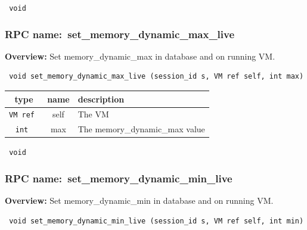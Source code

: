 \vspace{0.3cm}

{\tt 
void
}



\vspace{0.3cm}
\vspace{0.3cm}
\vspace{0.3cm}
\subsubsection{RPC name:~set\_memory\_dynamic\_max\_live}

{\bf Overview:} 
Set memory\_dynamic\_max in database and on running VM.

\begin{verbatim} void set_memory_dynamic_max_live (session_id s, VM ref self, int max)\end{verbatim}



 
\vspace{0.3cm}
\begin{tabular}{|c|c|p{7cm}|}
 \hline
{\bf type} & {\bf name} & {\bf description} \\ \hline
{\tt VM ref } & self & The VM \\ \hline 

{\tt int } & max & The memory\_dynamic\_max value \\ \hline 

\end{tabular}

\vspace{0.3cm}

{\tt 
void
}



\vspace{0.3cm}
\vspace{0.3cm}
\vspace{0.3cm}
\subsubsection{RPC name:~set\_memory\_dynamic\_min\_live}

{\bf Overview:} 
Set memory\_dynamic\_min in database and on running VM.

\begin{verbatim} void set_memory_dynamic_min_live (session_id s, VM ref self, int min)\end{verbatim}


